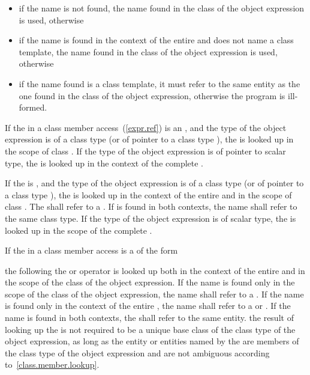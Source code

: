 \begin{itemize}
\item if the name is not found, the name found in the class of the object
expression is used, otherwise
\item if the name is found in the context of the entire
 and does not name a class template,
the name found in the class of the object expression is used, otherwise
\item if the name found is a class template, it must refer to the same
entity as the one found in the class of the object expression, otherwise
the program is ill-formed.
\end{itemize}

\pnum
If the  in a class member
access~(\ref{expr.ref}) is an , and the type of
the object expression is of a class type  (or of pointer to a
class type ), the
 is looked up in the scope of class .
If the type of the object expression is of pointer to scalar type,
the  is looked up in the context of the complete
.

\pnum
If the  is ,
and the type of the object expression is of a class type  (or
of pointer to a class type ), the
 is looked up in the context of the entire
 and in the scope of class .
The  shall refer to a .
If  is found in both contexts, the name shall
refer to the same class type. If the type of the object expression
is of scalar type, the  is
looked up in the scope of the complete .

\pnum
If the  in a class member access is a
 of the form

\begin{indented}
\end{indented}

the  following the  or
\tcode{->} operator is looked up both in the context of the entire
 and in the scope of the class of
the object expression. If the name is found only in the scope of the
class of the object expression, the name shall refer to a
. If the name is found only in the context of the
entire , the name shall refer to a
 or . If the name is
found in both contexts, the 
shall refer to the same entity. \enternote the result of looking up the
 is not required to be a unique
base class of the class type of the object expression, as long as the
entity or entities named by the  are members
of the class type of the object expression and are not ambiguous
according to~\ref{class.member.lookup}.

